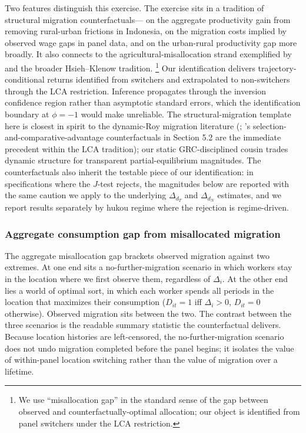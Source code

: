 Two features distinguish this exercise.
The exercise sits in a tradition of structural migration counterfactuals---\cite{bryanAggregateProductivityEffects2019} on the aggregate productivity gain from removing rural-urban frictions in Indonesia, \cite{lagakosMigrationCostsObservational2020} on the migration costs implied by observed wage gaps in panel data, and \cite{lagakosUrbanRuralGapsDeveloping2020a} on the urban-rural productivity gap more broadly.
It also connects to the agricultural-misallocation strand exemplified by \cite{adamopoulosMisallocationSelectionProductivity2022} and the broader Hsieh--Klenow tradition.%
\footnote{We use ``misallocation gap'' in the standard sense of the gap between observed and counterfactually-optimal allocation; our object is identified from panel switchers under the LCA restriction.}
Our identification delivers trajectory-conditional returns identified from switchers and extrapolated to non-switchers through the LCA restriction.
Inference propagates through the inversion confidence region rather than asymptotic standard errors, which the identification boundary at $\phi = -1$ would make unreliable.
The structural-migration template here is closest in spirit to the dynamic-Roy migration literature (\citealt{kennanEffectExpectedIncome2011}; \cite{suriSelectionComparativeAdvantage2011}'s selection-and-comparative-advantage counterfactuals in Section 5.2 are the immediate precedent within the LCA tradition); our static GRC-disciplined cousin trades dynamic structure for transparent partial-equilibrium magnitudes.
The counterfactuals also inherit the testable piece of our identification: in specifications where the $J$-test rejects, the magnitudes below are reported with the same caution we apply to the underlying $\Delta_{d_T}$ and $\Delta_{d_N}$ estimates, and we report results separately by hukou regime where the rejection is regime-driven.

\subsubsection{Aggregate consumption gap from misallocated migration}\label{sec:misallocation}

The aggregate misallocation gap brackets observed migration against two extremes.
At one end sits a no-further-migration scenario in which workers stay in the location where we first observe them, regardless of $\Delta_i$.
At the other end lies a world of optimal sort, in which each worker spends all periods in the location that maximizes their consumption ($D_{it} = 1$ iff $\Delta_i > 0$, $D_{it} = 0$ otherwise).
Observed migration sits between the two.
The contrast between the three scenarios is the readable summary statistic the counterfactual delivers.
Because location histories are left-censored, the no-further-migration scenario does not undo migration completed before the panel begins; it isolates the value of within-panel location switching rather than the value of migration over a lifetime.

